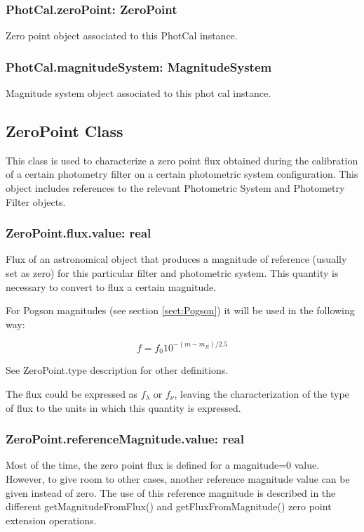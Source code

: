 \documentclass[11pt,a4paper]{ivoa}
\begin{document}
\subsubsection{PhotCal.zeroPoint: ZeroPoint}
Zero point object associated to this PhotCal instance.
\par

\subsubsection{PhotCal.magnitudeSystem: MagnitudeSystem}
Magnitude system object associated to this phot cal instance.
\par

\subsection{ZeroPoint Class}
This class is used to characterize a zero point flux obtained during the
calibration of a certain photometry filter on a certain photometric system
configuration. This object includes references to the relevant Photometric
System and Photometry Filter objects.
\par

\subsubsection{ZeroPoint.flux.value: real}
Flux of an astronomical object that produces a magnitude of reference
(usually set as zero) for this particular filter and photometric system.
This quantity is necessary to convert to flux a certain magnitude.
\par

For Pogson magnitudes (see section \ref{sect:Pogson}) it will be used in the following way:
\par
\begin{equation} \label{eq:24}
f = f_0 10^{-(m-m_R )/2.5}
\end{equation}

See ZeroPoint.type description for other definitions.
\par

The flux could be expressed as $f_{\lambda}$ or $f_{\nu}$, leaving the
characterization of the type of flux to the units in which this quantity
is expressed.
\par

\subsubsection{ZeroPoint.referenceMagnitude.value: real}
Most of the time, the zero point flux is defined for a magnitude=0 value.
However, to give room to other cases, another reference magnitude value can
be given instead of zero. The use of this reference magnitude is described in
the different getMagnitudeFromFlux() and getFluxFromMagnitude() zero point
extension operations.
\par
\end{document}
